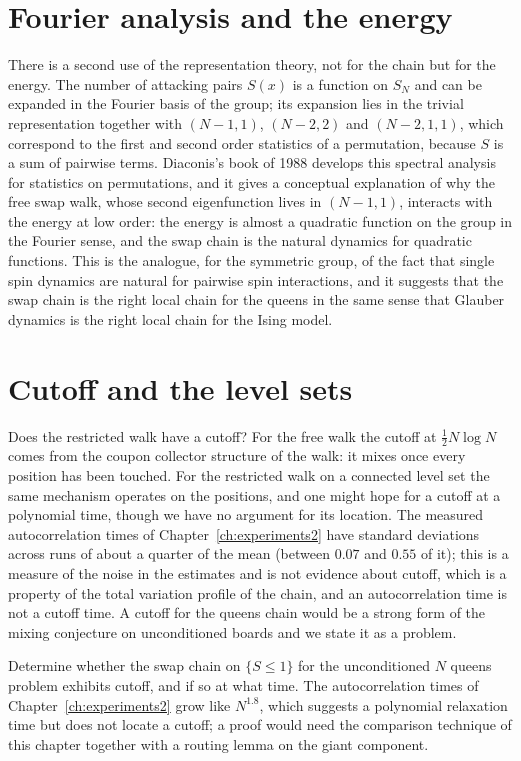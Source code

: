 \section{Fourier analysis and the energy}

There is a second use of the representation theory, not for the chain but for the energy. The number of attacking pairs $S(x)$ is a function on $S_N$ and can be expanded in the Fourier basis of the group; its expansion lies in the trivial representation together with $(N-1, 1)$, $(N-2, 2)$ and $(N-2, 1, 1)$, which correspond to the first and second order statistics of a permutation, because $S$ is a sum of pairwise terms. Diaconis's book of 1988 develops this spectral analysis for statistics on permutations, and it gives a conceptual explanation of why the free swap walk, whose second eigenfunction lives in $(N-1,1)$, interacts with the energy at low order: the energy is almost a quadratic function on the group in the Fourier sense, and the swap chain is the natural dynamics for quadratic functions. This is the analogue, for the symmetric group, of the fact that single spin dynamics are natural for pairwise spin interactions, and it suggests that the swap chain is the right local chain for the queens in the same sense that Glauber dynamics is the right local chain for the Ising model.

\section{Cutoff and the level sets}

Does the restricted walk have a cutoff? For the free walk the cutoff at $\tfrac12 N \log N$ comes from the coupon collector structure of the walk: it mixes once every position has been touched. For the restricted walk on a connected level set the same mechanism operates on the positions, and one might hope for a cutoff at a polynomial time, though we have no argument for its location. The measured autocorrelation times of Chapter~\ref{ch:experiments2} have standard deviations across runs of about a quarter of the mean (between $0.07$ and $0.55$ of it); this is a measure of the noise in the estimates and is not evidence about cutoff, which is a property of the total variation profile of the chain, and an autocorrelation time is not a cutoff time. A cutoff for the queens chain would be a strong form of the mixing conjecture on unconditioned boards and we state it as a problem.

\begin{problem}
Determine whether the swap chain on $\{ S \le 1 \}$ for the unconditioned $N$ queens problem exhibits cutoff, and if so at what time. The autocorrelation times of Chapter~\ref{ch:experiments2} grow like $N^{1.8}$, which suggests a polynomial relaxation time but does not locate a cutoff; a proof would need the comparison technique of this chapter together with a routing lemma on the giant component.
\end{problem}

